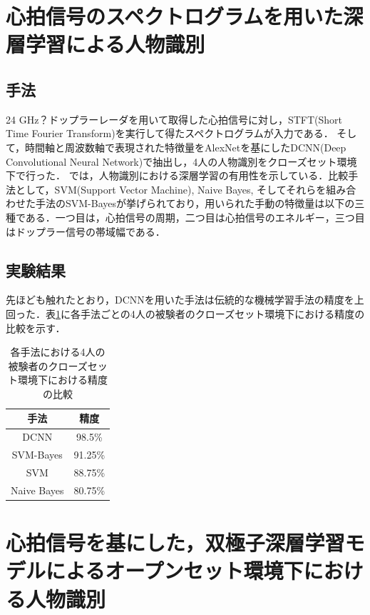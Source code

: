 \section{心拍信号のスペクトログラムを用いた深層学習による人物識別\cite{paper:HeartID}}
\subsection{手法}
24 GHz？ドップラーレーダを用いて取得した心拍信号に対し，STFT(Short Time Fourier Transform)を実行して得たスペクトログラムが入力である．
そして，時間軸と周波数軸で表現された特徴量をAlexNetを基にしたDCNN(Deep Convolutional Neural Network)で抽出し，4人の人物識別をクローズセット環境下で行った．
\cite{paper:HeartID}では，人物識別における深層学習の有用性を示している．比較手法として，SVM(Support Vector Machine), Naive Bayes, そしてそれらを組み合わせた手法のSVM-Bayesが挙げられており，用いられた手動の特徴量は以下の三種である．一つ目は，心拍信号の周期，二つ目は心拍信号のエネルギー，三つ目はドップラー信号の帯域幅である．

\subsection{実験結果}
先ほども触れたとおり，DCNNを用いた手法は伝統的な機械学習手法の精度を上回った．表\ref{table:HeartID}に各手法ごとの4人の被験者のクローズセット環境下における精度の比較を示す．

\begin{table}[H]
\caption{各手法における4人の被験者のクローズセット環境下における精度の比較}
\centering
\begin{tabular}{cc}
\hline
手法 & 精度 \\
\hline
DCNN & 98.5\% \\
SVM-Bayes & 91.25\% \\
SVM & 88.75\% \\
Naive Bayes & 80.75\% \\
\hline
\end{tabular}
\label{table:HeartID}
\end{table}

\section{心拍信号を基にした，双極子深層学習モデルによるオープンセット環境下における人物識別\cite{paper:HeartSignature}}
